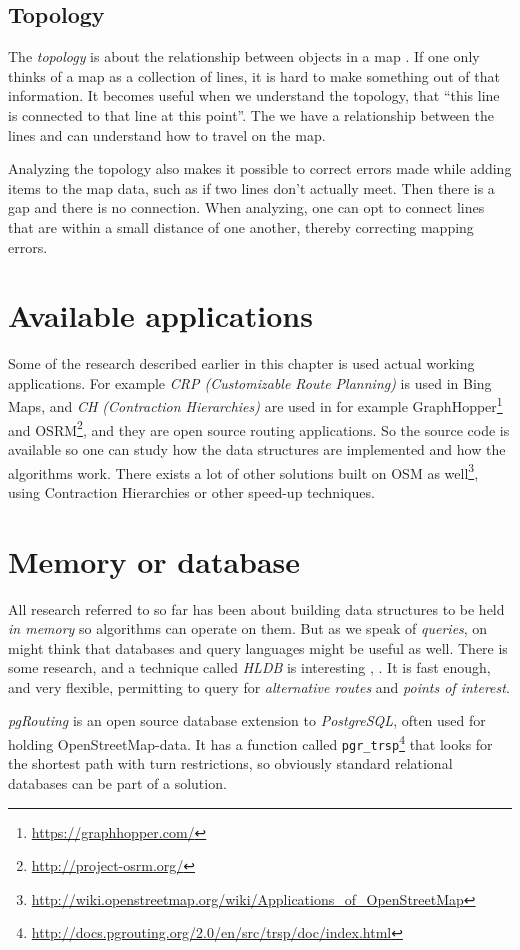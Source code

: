 \documentclass[../main.tex]{subfiles}
\begin{document}
\subsection{Topology}
The \textit{topology} is about the relationship between objects in a map \cite{qgis-topology}. If one only thinks of a map as a collection of lines, it is hard to make something out of that information. It becomes useful when we understand the topology, that ``this line is connected to that line at this point''. The we have a relationship between the lines and can understand how to travel on the map.

Analyzing the topology also makes it possible to correct errors made while adding items to the map data, such as if two lines don't actually meet. Then there is a gap and there is no connection. When analyzing, one can opt to connect lines that are within a small distance of one another, thereby correcting mapping errors.

\section{Available applications}\label{sect:available-applications}
Some of the research described earlier in this chapter is used actual working applications. For example \emph{CRP (Customizable Route Planning)} \cite{crp-2013} is used in Bing Maps, and \emph{CH (Contraction Hierarchies)} are used in for example GraphHopper\footnote{\url{https://graphhopper.com/}} and OSRM\footnote{\url{http://project-osrm.org/}}, and they are open source routing applications. So the source code is available so one can study how the data structures are implemented and how the algorithms work. There exists a lot of other solutions built on OSM as well\footnote{\url{http://wiki.openstreetmap.org/wiki/Applications_of_OpenStreetMap}}, using Contraction Hierarchies or other speed-up techniques.

\section{Memory or database}
All research referred to so far has been about building data structures to be held \emph{in memory} so algorithms can operate on them. But as we speak of \emph{queries}, on might think that databases and query languages might be useful as well. There is some research, and a technique called \emph{HLDB} is interesting \cite{hldb-2012}, \cite{hldb-msr-2012}. It is fast enough, and very flexible, permitting to query for \emph{alternative routes} and \emph{points of interest}.

\emph{pgRouting} is an open source database extension to \emph{PostgreSQL}, often used for holding OpenStreetMap-data. It has a function called \verb|pgr_trsp|\footnote{\url{http://docs.pgrouting.org/2.0/en/src/trsp/doc/index.html}} that looks for the shortest path with turn restrictions, so obviously standard relational databases can be part of a solution.
\end{document}
